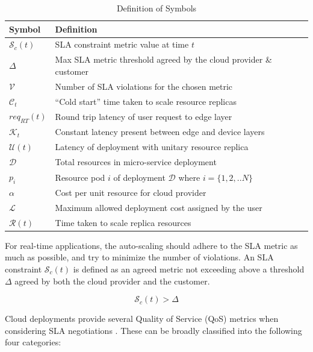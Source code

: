 \begin{table}
    \caption{Definition of Symbols}\label{tab:symbol-definitions}
    \centering
    \begin{tabular}{|l l|}
        \hline
        Symbol & Definition\\
        \hline
        $\mathcal{S}_{c}(t)$ & SLA constraint metric value at time $t$\\
        $\Delta$ & Max SLA metric threshold agreed by the cloud provider \& customer\\
        $\mathcal{V}$ & Number of SLA violations for the chosen metric\\
        $\mathcal{C}_{t}$ & ``Cold start'' time taken to scale resource replicas\\
        $req_{RT}(t)$ & Round trip latency of user request to edge layer\\
        $\mathcal{K}_{t}$ & Constant latency present between edge and device layers\\
        $\mathcal{U}(t)$ & Latency of deployment with unitary resource replica\\
        $\mathcal{D}$ & Total resources in micro-service deployment\\
        $p_{i}$ & Resource pod $i$ of deployment $\mathcal{D}$ where $i = \{1, 2, .. N\}$\\
        $\alpha$ & Cost per unit resource for cloud provider\\
        $\mathcal{L}$ & Maximum allowed deployment cost assigned by the user\\
        $\mathcal{R}(t)$ & Time taken to scale replica resources\\
        \hline
    \end{tabular}
\end{table}

For real-time applications, the auto-scaling should adhere to the SLA metric as much as possible, and try to minimize the number of violations. An SLA constraint $\mathcal{S}_{c}(t)$ is defined as an agreed metric not exceeding above a threshold $\Delta$ agreed by both the cloud provider and the customer.

\begin{equation}
    \mathcal{S}_{c}(t) > \Delta
\end{equation}

Cloud deployments provide several Quality of Service (QoS) metrics when considering SLA negotiations \cite{serrano2016sla}. These can be broadly classified into the following four categories:


